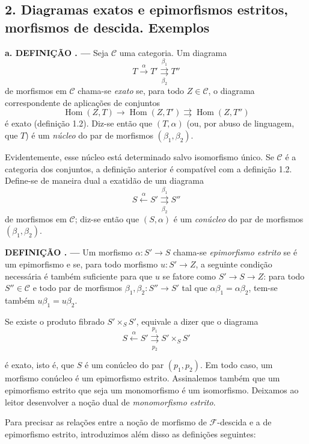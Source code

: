\documentclass[11pt,twoside,openany]{book}
\numberwithin{equation}{section}
\newcommand{\src}[1]{%
  \phantomsection\hypertarget{src:#1}{}%
  \marginpar{\raggedleft\footnotesize\sffamily #1}%
}
\theoremstyle{plain}
\theoremstyle{definition}
\theoremstyle{remark}
\newcommand{\result}[2]{%
  \par\medskip\noindent\textbf{#1%
  \if\relax\detokenize{#2}\relax\else\space#2\fi. ---}\enspace
}
\newcommand{\FgaUnitKey}{frontmatter}
\renewcommand{\src}[1]{%
  \phantomsection\hypertarget{src:\FgaUnitKey:#1}{}%
  \marginpar{\raggedleft\footnotesize\sffamily #1}%
}
\begin{document}
\subsection*{2. Diagramas exatos e epimorfismos estritos, morfismos de
descida. Exemplos}

\result{a. DEFINIÇÃO}{2.1} Seja $\mathcal C$ uma categoria. Um diagrama
\[
  T\xrightarrow{\alpha}T'
  \overset{\beta_1}{\underset{\beta_2}{\rightrightarrows}}T''
\]
de morfismos em $\mathcal C$ chama-se \emph{exato} se, para todo
$Z\in\mathcal C$, o diagrama correspondente de aplicações de conjuntos
\[
  \operatorname{Hom}(Z,T)\longrightarrow
  \operatorname{Hom}(Z,T')
  \rightrightarrows\operatorname{Hom}(Z,T'')
\]
é exato (definição 1.2). Diz-se então que $(T,\alpha)$ (ou, por abuso de
linguagem, que $T$) é um \emph{núcleo} do par de morfismos
$(\beta_1,\beta_2)$.

Evidentemente, esse núcleo está determinado salvo isomorfismo único. Se
$\mathcal C$ é a categoria dos conjuntos, a definição anterior é
compatível com a definição 1.2. Define-se de maneira dual a exatidão de um
diagrama
\[
  S\xleftarrow{\alpha}S'
  \overset{\beta_1}{\underset{\beta_2}{\rightrightarrows}}S''
\]
de morfismos em $\mathcal C$; diz-se então que $(S,\alpha)$ é um
\emph{conúcleo} do par de morfismos $(\beta_1,\beta_2)$.

\result{DEFINIÇÃO}{2.2} Um morfismo $\alpha:S'\longrightarrow S$ chama-se
\emph{epimorfismo estrito} se é um epimorfismo e se, para todo morfismo
$u:S'\longrightarrow Z$, a seguinte condição necessária é também
suficiente para que $u$ se fatore como
$S'\longrightarrow S\longrightarrow Z$: para todo $S''\in\mathcal C$ e todo
par de morfismos $\beta_1,\beta_2:S''\longrightarrow S'$ tal que
$\alpha\beta_1=\alpha\beta_2$, tem-se também $u\beta_1=u\beta_2$.

Se existe o produto fibrado $S'\times_S S'$, equivale a dizer que o diagrama
\[
  S\xleftarrow{\alpha}S'
  \overset{p_1}{\underset{p_2}{\rightrightarrows}}S'\times_S S'
\]

\src{305}
é exato, isto é, que $S$ é um conúcleo do par $(p_1,p_2)$. Em todo
caso, um morfismo conúcleo é um epimorfismo estrito. Assinalemos também que um
epimorfismo estrito que seja um monomorfismo é um isomorfismo. Deixamos ao
leitor desenvolver a noção dual de \emph{monomorfismo estrito}.

Para precisar as relações entre a noção de morfismo de
$\mathcal F$-descida e a de epimorfismo estrito, introduzimos além disso as
definições seguintes:
\end{document}
